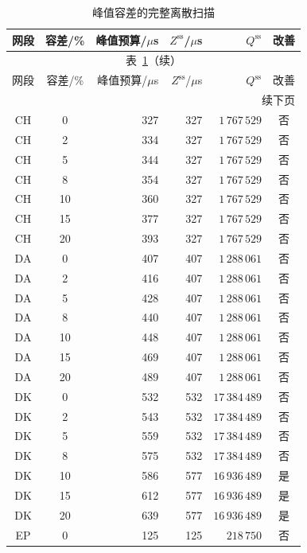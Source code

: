 \documentclass[UTF8,a4paper,twoside,zihao=-4]{ctexart}
\numberwithin{equation}{section}
\numberwithin{figure}{section}
\numberwithin{table}{section}
\theoremstyle{definition}
\numberwithin{algocf}{section}
\begin{document}
{\small
\begin{longtable}{@{}ccrrrc@{}}
\caption{峰值容差的完整离散扫描}
\label{tab:appendix-tolerance}\\
\toprule
网段 & 容差/\% & 峰值预算/$\mu$s & $Z^{\mathrm{ss}}$/$\mu$s & $Q^{\mathrm{ss}}$ & 改善 \\
\midrule
\endfirsthead
\multicolumn{6}{c}{表~\ref{tab:appendix-tolerance}（续）}\\
\toprule
网段 & 容差/\% & 峰值预算/$\mu$s & $Z^{\mathrm{ss}}$/$\mu$s & $Q^{\mathrm{ss}}$ & 改善 \\
\midrule
\endhead
\midrule
\multicolumn{6}{r}{续下页}\\
\endfoot
\bottomrule
\endlastfoot
CH & 0  & 327 & 327 & $1\,767\,529$  & 否 \\
CH & 2  & 334 & 327 & $1\,767\,529$  & 否 \\
CH & 5  & 344 & 327 & $1\,767\,529$  & 否 \\
CH & 8  & 354 & 327 & $1\,767\,529$  & 否 \\
CH & 10 & 360 & 327 & $1\,767\,529$  & 否 \\
CH & 15 & 377 & 327 & $1\,767\,529$  & 否 \\
CH & 20 & 393 & 327 & $1\,767\,529$  & 否 \\
\addlinespace
DA & 0  & 407 & 407 & $1\,288\,061$  & 否 \\
DA & 2  & 416 & 407 & $1\,288\,061$  & 否 \\
DA & 5  & 428 & 407 & $1\,288\,061$  & 否 \\
DA & 8  & 440 & 407 & $1\,288\,061$  & 否 \\
DA & 10 & 448 & 407 & $1\,288\,061$  & 否 \\
DA & 15 & 469 & 407 & $1\,288\,061$  & 否 \\
DA & 20 & 489 & 407 & $1\,288\,061$  & 否 \\
\addlinespace
DK & 0  & 532 & 532 & $17\,384\,489$ & 否 \\
DK & 2  & 543 & 532 & $17\,384\,489$ & 否 \\
DK & 5  & 559 & 532 & $17\,384\,489$ & 否 \\
DK & 8  & 575 & 532 & $17\,384\,489$ & 否 \\
DK & 10 & 586 & 577 & $16\,936\,489$ & 是 \\
DK & 15 & 612 & 577 & $16\,936\,489$ & 是 \\
DK & 20 & 639 & 577 & $16\,936\,489$ & 是 \\
\addlinespace
EP & 0  & 125 & 125 & $218\,750$    & 否 \\

\end{longtable}}
\end{document}
